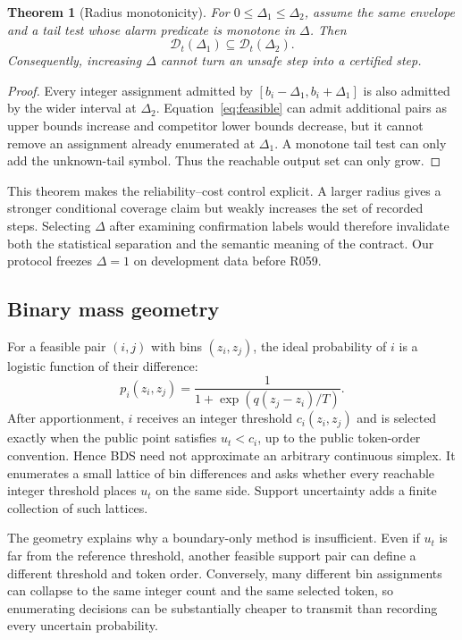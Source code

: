 \documentclass[sigconf,review,nonacm]{acmart}
\newtheorem{theorem}{Theorem}
\newcommand{\DecisionSet}{\mathcal{D}}
\begin{document}
\begin{theorem}[Radius monotonicity]
For $0\le\Delta_1\le\Delta_2$, assume the same envelope and a tail test whose alarm predicate is monotone in $\Delta$. Then
\begin{equation}
  \DecisionSet_t(\Delta_1)\subseteq\DecisionSet_t(\Delta_2).
\end{equation}
Consequently, increasing $\Delta$ cannot turn an unsafe step into a certified step.
\end{theorem}
\begin{proof}
Every integer assignment admitted by $[b_i-\Delta_1,b_i+\Delta_1]$ is also admitted by the wider interval at $\Delta_2$. Equation~\eqref{eq:feasible} can admit additional pairs as upper bounds increase and competitor lower bounds decrease, but it cannot remove an assignment already enumerated at $\Delta_1$. A monotone tail test can only add the unknown-tail symbol. Thus the reachable output set can only grow.
\end{proof}

This theorem makes the reliability--cost control explicit. A larger radius gives a stronger conditional coverage claim but weakly increases the set of recorded steps. Selecting $\Delta$ after examining confirmation labels would therefore invalidate both the statistical separation and the semantic meaning of the contract. Our protocol freezes $\Delta=1$ on development data before R059.

\subsection{Binary mass geometry}
For a feasible pair $(i,j)$ with bins $(z_i,z_j)$, the ideal probability of $i$ is a logistic function of their difference:
\begin{equation}
  p_i(z_i,z_j)=\frac{1}{1+\exp(q(z_j-z_i)/T)}.
  \label{eq:logistic}
\end{equation}
After apportionment, $i$ receives an integer threshold $c_i(z_i,z_j)$ and is selected exactly when the public point satisfies $u_t<c_i$, up to the public token-order convention. Hence BDS need not approximate an arbitrary continuous simplex. It enumerates a small lattice of bin differences and asks whether every reachable integer threshold places $u_t$ on the same side. Support uncertainty adds a finite collection of such lattices.

The geometry explains why a boundary-only method is insufficient. Even if $u_t$ is far from the reference threshold, another feasible support pair can define a different threshold and token order. Conversely, many different bin assignments can collapse to the same integer count and the same selected token, so enumerating decisions can be substantially cheaper to transmit than recording every uncertain probability.
\end{document}
